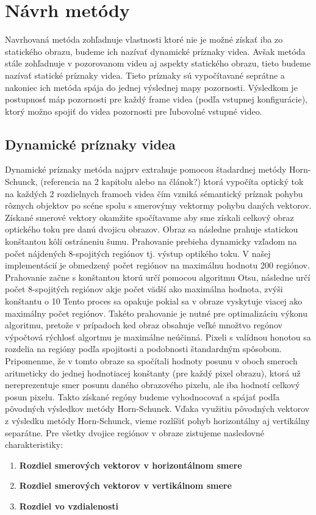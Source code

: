 \section{Návrh metódy}
Navrhovaná metóda zohľadnuje vlastnosti ktoré nie je možné získať iba zo statického obrazu, budeme ich nazívať dynamické príznaky videa.
Avšak metóda stále zohľadnuje v pozorovanom videu aj aspekty statického obrazu, tieto budeme nazívať statické príznaky videa.
Tieto príznaky sú vypočítavané seprátne a nakoniec ich metóda spája do jednej výslednej mapy pozornosti. Výsledkom je postupnosť máp pozornosti pre každý frame videa (podľa vstupnej konfigurácie), ktorý možno spojiť do videa pozornosti pre ľubovolné vstupné video.

\subsection{Dynamické príznaky videa}
Dynamické príznaky metóda najprv extrahuje pomocou štadardnej metódy Horn-Schunck, (referencia na 2 kapitolu alebo na článok?) ktorá vypočíta optický tok na každých 2 rozdielnych framoch videa čím vzniká sémantický príznak pohybu rôznych objektov po scéne spolu s smerovýmy vektormy pohybu daných vektorov.
Získané smerové vektory okamžite spočítavame aby sme získali celkový obraz optického toku pre danú dvojicu obrazov.
Obraz sa následne prahuje statickou konštantou kôli ostráneniu šumu.
Prahovanie prebieha dynamicky vzľadom na počet nájdených 8-spojitých regiónov tj. výstup optikého toku. V našej implementácií je obmedzený počet regiónov na maximálnu hodnotu 200 regiónov.
Prahovanie začne s konštantou ktorú určí pomocou algoritmu Otsu\cite{otsu}, následne určí počet 8-spojitých regiónov akje počet vädší ako maximálna hodnota, zvýši konštantu o 10%
Tento proces sa opakuje pokial sa v obraze vyskytuje viacej ako maximálny počet regiónov.
Takéto prahovanie je nutné pre optimalizáciu výkonu algoritmu, pretože v prípadoch ked obraz obsahuje veľké množtvo regónov výpočtová rýchlosť algortmu je maximálne neúčinná.
Pixeli s valídnou honotou sa rozdelia na regióny podľa spojitosti a podobnosti štandardným spôsobom.
Pripomenme, že v tomto obraze sa spočítali hodnoty posunu v oboch smeroch aritmeticky do jednej hodnotiacej konštanty (pre každý pixel obrazu), ktorá už nereprezentuje smer posunu daného obrazového pixelu, ale iba hodnotí celkový posun pixelu.
Takto získané regóny budeme vyhodnocovať a spájať podľa pôvodných výsledkov metódy Horn-Schunck.
Vďaka využitiu pôvodných vektorov z výsledku metódy Horn-Schunck, vieme rozlíšiť pohyb horizontálny aj vertikálny separátne.
Pre všetky dvojice regiónov v obraze zistujeme nasledovné charakteristiky:
\begin{enumerate}
  \item\textbf{Rozdiel smerových vektorov v horizontálnom smere}
  \item\textbf{Rozdiel smerových vektorov v vertikálnom smere}
  \item\textbf{Rozdiel vo vzdialenosti}
\end{enumerate}
